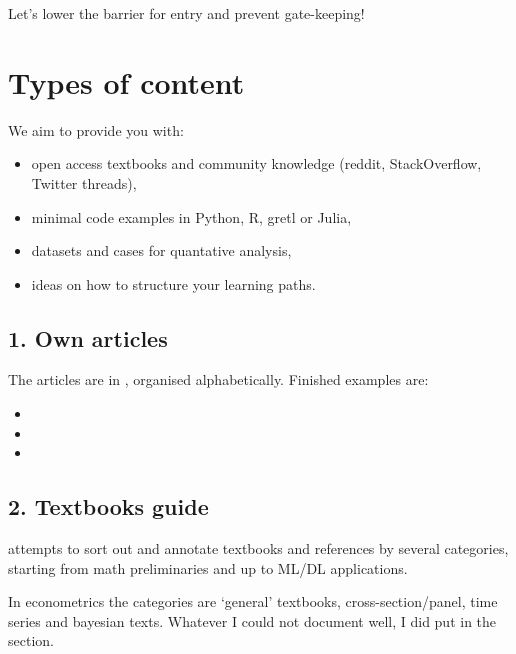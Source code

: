 \documentclass[letterpaper,10pt,english]{sphinxmanual}
\begin{document}
Let’s lower the barrier for entry and prevent gate-keeping!


\section{Types of content}
\label{\detokenize{index:types-of-content}}
We aim to provide you with:
\begin{itemize}
\item {} 
open access textbooks and community knowledge (reddit,
StackOverflow, Twitter threads),

\item {} 
minimal code examples in Python, R, gretl or Julia,

\item {} 
datasets and cases for quantative analysis,

\item {} 
ideas on how to structure your learning paths.

\end{itemize}


\subsection{1. Own articles}
\label{\detokenize{index:own-articles}}
The articles are in ,
organised alphabetically. Finished examples are:
\begin{itemize}
\item {} 

\item {} 

\item {} 

\end{itemize}


\subsection{2. Textbooks guide}
\label{\detokenize{index:textbooks-guide}}
 attempts to sort out and annotate textbooks and
references by several categories, starting from math preliminaries and up to ML/DL
applications.

In econometrics the categories are ‘general’ textbooks, cross-section/panel, time series
and bayesian texts. Whatever I could not document well, I did put in the
 section.
\end{document}
